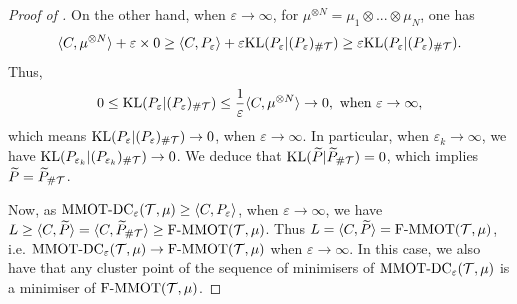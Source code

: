 \begin{proof}[Proof of ]
On the other hand, when $\varepsilon \to \infty$, for $\mu^{\otimes N} = \mu_1 \otimes ... \otimes \mu_N$, one has
\begin{equation}
  \langle C, \mu^{\otimes N} \rangle + \varepsilon \times 0 \geq \langle C, P_{\varepsilon} \rangle +
  \varepsilon \text{KL}(P_{\varepsilon} \vert (P_{\varepsilon})_{\# \mathcal T})
  \geq \varepsilon \text{KL}(P_{\varepsilon} \vert (P_{\varepsilon})_{\# \mathcal T}).
\end{equation}
Thus,
\begin{equation}
  0 \leq \text{KL}(P_{\varepsilon} \vert (P_{\varepsilon})_{\# \mathcal T}) \leq
  \frac{1}{\varepsilon} \langle C, \mu^{\otimes N} \rangle \to 0, \text{ when } \varepsilon \to \infty,
\end{equation}
which means $\text{KL}(P_{\varepsilon} \vert (P_{\varepsilon})_{\# \mathcal T}) \to 0$, when $\varepsilon \to \infty$. In particular,
when $\varepsilon_k \to \infty$, we have $\text{KL}(P_{\varepsilon_k} \vert (P_{\varepsilon_k})_{\# \mathcal T}) \to 0$. We deduce that
$\text{KL}(\widetilde{P} \vert \widetilde{P}_{\# \mathcal T}) = 0$, which implies $\widetilde{P} = \widetilde{P}_{\# \mathcal T}$.

Now, as $\text{MMOT-DC}_{\varepsilon}(\mathcal T, \mu) \geq \langle C, P_{\varepsilon} \rangle$,
when $\varepsilon \to \infty$, we have $L \geq \langle C, \widetilde{P} \rangle =
\langle C, \widetilde{P}_{\# \mathcal T} \rangle \geq \text{F-MMOT}(\mathcal T, \mu)$.
Thus $L = \langle C, \widetilde{P} \rangle = \text{F-MMOT}(\mathcal T, \mu)$, i.e.
$\text{MMOT-DC}_{\varepsilon}(\mathcal T, \mu) \to \text{F-MMOT}(\mathcal T, \mu)$ when $\varepsilon \to \infty$. In this case,
we also have that any cluster point of the sequence of minimisers of $\text{MMOT-DC}_{\varepsilon}(\mathcal T, \mu)$
is a minimiser of $\text{F-MMOT}(\mathcal T, \mu)$.
\end{proof}

